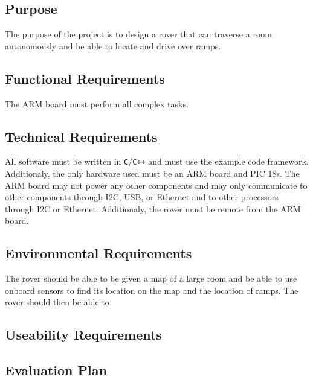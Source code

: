 









\subsection*{Purpose}
The purpose of the project is to design a rover that can traverse a room autonomously and be able to locate and drive over ramps.

\subsection*{Functional Requirements}
The ARM board must perform all complex tasks. 

\subsection*{Technical Requirements}
All software must be written in \texttt{C}/\texttt{C++} and must use the example code framework. Additionaly, the only hardware used must be an ARM board and PIC 18s. The ARM board may not power any other components and may only communicate to other components through I2C, USB, or Ethernet and to other processors through I2C or Ethernet. Additionaly, the rover must be remote from the ARM board.

\subsection*{Environmental Requirements}
The rover should be able to be given a map of a large room and be able to use onboard sensors to find its location on the map and the location of ramps. The rover should then be able to 

\subsection*{Useability Requirements}

\subsection*{Evaluation Plan}






